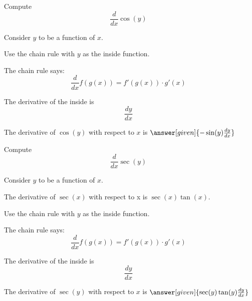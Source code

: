 \documentclass{ximera}
\begin{document}
\begin{question} %
  Compute
  \[
  \frac{d}{dx} \cos(y)
  \]
  
	  
    \begin{hint}
      Consider $y$ to be a function of $x$.
    \end{hint}
    \begin{hint}
      Use the chain rule with $y$ as the inside function.
    \end{hint}
    \begin{hint}
      The chain rule says:
      \[
      \frac{d}{dx} f(g(x)) = f'(g(x))\cdot g'(x)
      \]
    \end{hint}
    \begin{hint}
      The derivative of the inside is 
      \[
      \frac{dy}{dx}
      \]
    \end{hint}
    
		The derivative of $\cos(y)$ with respect to $x$ is
		 $\answer[given]{-\sin(y) \frac{dy}{dx}}$
		
\end{question}

\begin{question} %
  Compute
  \[
  \frac{d}{dx} \sec(y)
  \]
  
	  
    \begin{hint}
      Consider $y$ to be a function of $x$.
    \end{hint}
    \begin{hint}
     The derivative of $\sec(x)$ with respect to x is $\sec(x)\tan(x)$.
    \end{hint}
		\begin{hint}
      Use the chain rule with $y$ as the inside function.
    \end{hint}
    \begin{hint}
      The chain rule says:
      \[
      \frac{d}{dx} f(g(x)) = f'(g(x))\cdot g'(x)
      \]
    \end{hint}
    \begin{hint}
      The derivative of the inside is 
      \[
      \frac{dy}{dx}
      \]
    \end{hint}
    
		The derivative of $\sec(y)$ with respect to $x$ is
		 $\answer[given]{\sec(y)\tan(y) \frac{dy}{dx}}$
		
\end{question}
\end{document}
